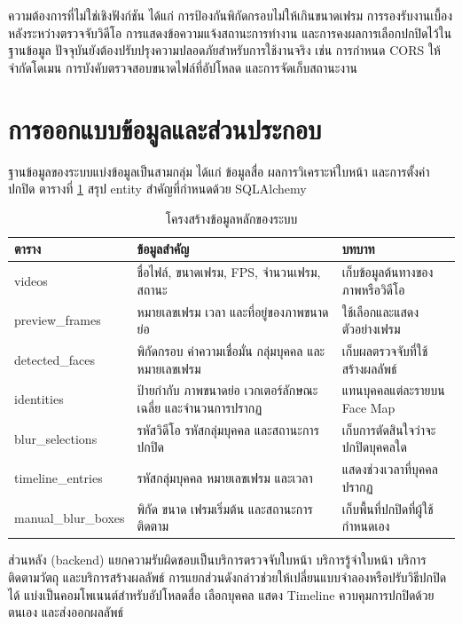 ความต้องการที่ไม่ใช่เชิงฟังก์ชัน ได้แก่ การป้องกันพิกัดกรอบไม่ให้เกินขนาดเฟรม การรองรับงานเบื้องหลังระหว่างตรวจจับวิดีโอ การแสดงข้อความแจ้งสถานะการทำงาน และการคงผลการเลือกปกปิดไว้ในฐานข้อมูล ปัจจุบันยังต้องปรับปรุงความปลอดภัยสำหรับการใช้งานจริง เช่น การกำหนด CORS ให้จำกัดโดเมน การบังคับตรวจสอบขนาดไฟล์ที่อัปโหลด และการจัดเก็บสถานะงาน

\section{การออกแบบข้อมูลและส่วนประกอบ}

ฐานข้อมูลของระบบแบ่งข้อมูลเป็นสามกลุ่ม ได้แก่ ข้อมูลสื่อ ผลการวิเคราะห์ใบหน้า และการตั้งค่าปกปิด ตารางที่ \ref{tab:data-model} สรุป entity สำคัญที่กำหนดด้วย SQLAlchemy

\begin{table}[H]
\centering
\caption{โครงสร้างข้อมูลหลักของระบบ}
\label{tab:data-model}
\begin{tabular}{|p{}|p{}|p{}|}
\hline
\textbf{ตาราง} & \textbf{ข้อมูลสำคัญ} & \textbf{บทบาท} \\
\hline
videos & ชื่อไฟล์, ขนาดเฟรม, FPS, จำนวนเฟรม, สถานะ & เก็บข้อมูลต้นทางของภาพหรือวิดีโอ \\
\hline
preview\_frames & หมายเลขเฟรม เวลา และที่อยู่ของภาพขนาดย่อ & ใช้เลือกและแสดงตัวอย่างเฟรม \\
\hline
detected\_faces & พิกัดกรอบ ค่าความเชื่อมั่น กลุ่มบุคคล และหมายเลขเฟรม & เก็บผลตรวจจับที่ใช้สร้างผลลัพธ์ \\
\hline
identities & ป้ายกำกับ ภาพขนาดย่อ เวกเตอร์ลักษณะเฉลี่ย และจำนวนการปรากฏ & แทนบุคคลแต่ละรายบน Face Map \\
\hline
blur\_selections & รหัสวิดีโอ รหัสกลุ่มบุคคล และสถานะการปกปิด & เก็บการตัดสินใจว่าจะปกปิดบุคคลใด \\
\hline
timeline\_entries & รหัสกลุ่มบุคคล หมายเลขเฟรม และเวลา & แสดงช่วงเวลาที่บุคคลปรากฏ \\
\hline
manual\_blur\_boxes & พิกัด ขนาด เฟรมเริ่มต้น และสถานะการติดตาม & เก็บพื้นที่ปกปิดที่ผู้ใช้กำหนดเอง \\
\hline
\end{tabular}
\end{table}

ส่วนหลัง (backend) แยกความรับผิดชอบเป็นบริการตรวจจับใบหน้า บริการรู้จำใบหน้า บริการติดตามวัตถุ และบริการสร้างผลลัพธ์ การแยกส่วนดังกล่าวช่วยให้เปลี่ยนแบบจำลองหรือปรับวิธีปกปิดได้ แบ่งเป็นคอมโพเนนต์สำหรับอัปโหลดสื่อ เลือกบุคคล แสดง Timeline ควบคุมการปกปิดด้วยตนเอง และส่งออกผลลัพธ์

